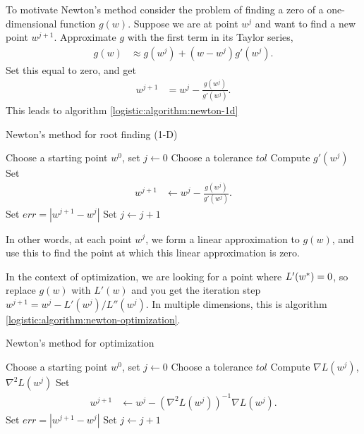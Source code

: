 To motivate Newton's method consider the problem of finding a zero of a one-dimensional function $g(w)$.  Suppose we are at point $w^j$ and want to find a new point $w^{j+1}$.  Approximate $g$ with the first term in its Taylor series,
\begin{align*}
  g(w) &\approx g(w^j) + (w - w^j)g'(w^j).
\end{align*}
Set this equal to zero, and get
\begin{align*}
  w^{j+1} &= w^j - \frac{g(w^j)}{g'(w^j)}.
\end{align*}
This leads to algorithm \ref{logistic:algorithm:newton-1d}
\begin{algorithm}
  \begin{algorithmic}[1]
    \caption{Newton's method for root finding (1-D)}
    \label{logistic:algorithm:newton-1d}
    \State Choose a starting point $w^0$, set $j\gets0$
    \State Choose a tolerance $tol$
        \State Compute $g'(w^j)$
        \State Set 
        \begin{align*}
          w^{j+1} &\gets w^j - \frac{g(w^j)}{g'(w^j)}.
        \end{align*}
        \State Set $err = |w^{j+1} - w^j|$
        \State Set $j\gets j+1$
    \EndWhile
  \end{algorithmic}
\end{algorithm}
In other words, at each point $w^j$, we form a linear approximation to $g(w)$, and use this to find the point at which this linear approximation is zero.

In the context of optimization, we are looking for a point where $L'({w^\ast})=0$, so replace $g(w)$ with $L'(w)$ and you get the iteration step $w^{j+1} = w^j - L'(w^j)/L''(w^j)$.  In multiple dimensions, this is algorithm \ref{logistic:algorithm:newton-optimization}.
\begin{algorithm}
  \begin{algorithmic}[1]
    \caption{Newton's method for optimization}
    \label{logistic:algorithm:newton-optimization}
    \State Choose a starting point $w^0$, set $j\gets0$
    \State Choose a tolerance $tol$
        \State Compute $\nabla L(w^j)$, $\nabla^2L(w^j)$
        \State Set 
        \begin{align*}
          w^{j+1} &\gets w^j - (\nabla^2L(w^j))^{-1}\nabla L(w^j).
        \end{align*}
        \State Set $err = |w^{j+1} - w^j|$
        \State Set $j\gets j+1$
    \EndWhile
  \end{algorithmic}
\end{algorithm}


